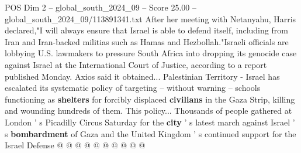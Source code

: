 \begin{textsample}{POS Dim 2 – global\_south\_2024\_09 – Score 25.00 – global\_south\_2024\_09/113891341.txt}
After her meeting with Netanyahu, Harris declared,"I will always ensure that Israel is able to defend itself, including from Iran and Iran-backed militias such as Hamas and Hezbollah."Israeli officials are lobbying U.S. lawmakers to pressure South Africa into dropping its genocide case against Israel at the International Court of Justice, according to a report published Monday.
Axios said it obtained...
Palestinian Territory - Israel has escalated its systematic policy of targeting -- without warning -- schools functioning as \textbf{shelters} for forcibly displaced \textbf{civilians} in the Gaza Strip, killing and wounding hundreds of them.
This policy...
Thousands of people gathered at London ' s Picadilly Circus Saturday for the \textbf{city} ' s latest march against Israel ' s \textbf{bombardment} of Gaza and the United Kingdom ' s continued support for the Israel Defense @ @ @ @ @ @ @ @ @ @

\end{textsample}
